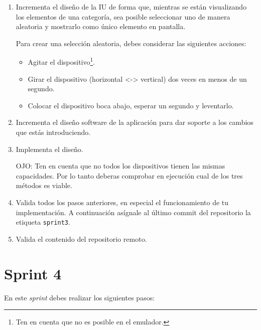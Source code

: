 \documentclass[11pt,a4paper]{article}
\begin{document}
\begin{enumerate}
\item Incrementa el diseño de la IU de forma que, mientras se están
  visualizando los elementos de una categoría, sea posible seleccionar
  uno de manera aleatoria y mostrarlo como único elemento en pantalla.

  Para crear una selección aleatoria, debes considerar las siguientes
  acciones:

  \begin{itemize}
  \item Agitar el dispositivo\footnote{Ten en cuenta que no es posible
      en el emulador.}.
  \item Girar el dispositivo (horizontal <-> vertical) dos veces en
    menos de un segundo.
  \item Colocar el dispositivo boca abajo, esperar un segundo y
    leventarlo.
  \end{itemize}

\item Incrementa el diseño software de la aplicación para dar soporte
  a los cambios que estás introduciendo.

\item Implementa el diseño.

  OJO: Ten en cuenta que no todos los dispositivos tienen las mismas
  capacidades. Por lo tanto deberas comprobar en ejecución cual de los
  tres métodos es viable.

\item Valida todos los pasos anteriores, en especial el funcionamiento
  de tu implementación. A continuación asígnale al último commit del
  repositorio la etiqueta \texttt{sprint3}.

\item Valida el contenido del repositorio remoto.
\end{enumerate}



\section{Sprint 4}


En este \emph{sprint} debes realizar los siguientes pasos:
\end{document}
